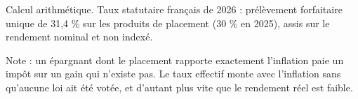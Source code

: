 Calcul arithmétique. Taux statutaire français de 2026 : prélèvement forfaitaire unique de 31,4 \% sur les produits de placement (30 \% en 2025), assis sur le rendement nominal et non indexé.\par Note : un épargnant dont le placement rapporte exactement l'inflation paie un impôt sur un gain qui n'existe pas. Le taux effectif monte avec l'inflation sans qu'aucune loi ait été votée, et d'autant plus vite que le rendement réel est faible.
